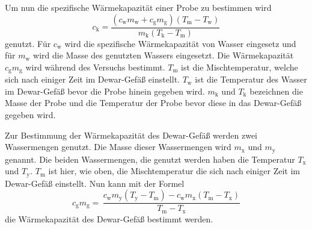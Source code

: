 Um nun die spezifische Wärmekapazität einer Probe zu bestimmen wird
\begin{equation}
   c_\text{k} = \frac{(c_\text{w}m_\text{w} + c_\text{g}m_\text{g})(T_\text{m}-T_\text{w})}{m_\text{k}(T_\text{k}-T_\text{m})} 
   \label{eqn:kapa}
\end{equation}
genutzt.
Für $c_\text{w}$ wird die spezifische Wärmekapazität von Wasser eingesetz und für $m_\text{w}$ wird die Masse des genutzten Wassers eingesetzt.
Die Wärmekapazität $c_\text{g}m_\text{g}$ wird während des Versuchs bestimmt.
$T_\text{m}$ ist die Mischtemperatur, welche sich nach einiger Zeit im Dewar-Gefäß einstellt.
$T_\text{w}$ ist die Temperatur des Wasser im Dewar-Gefäß bevor die Probe hinein gegeben wird.
$m_\text{k}$ und $T_\text{k}$ bezeichnen die Masse der Probe und die Temperatur der Probe bevor diese in das Dewar-Gefäß gegeben wird.

Zur Bestimmung der Wärmekapazität des Dewar-Gefäß werden zwei Wassermengen genutzt.
Die Masse dieser Wassermengen wird $m_\text{x}$ und $m_\text{y}$ genannt.
Die beiden Wassermengen, die genutzt werden haben die Temperatur $T_\text{x}$ und $T_\text{y}$.
$T_\text{m}$ ist hier, wie oben, die Mischtemperatur die sich nach einiger Zeit im Dewar-Gefäß einstellt.
Nun kann mit der Formel
\begin{equation}
    c_\text{g} m_\text{g} = \, \frac{c_\text{w}m_\text{y}(T_\text{y}-T_\text{m})-c_\text{w}m_\text{x}(T_\text{m}-T_\text{x})}{T_\text{m}-T_\text{x}}
    \label{eqn:dewar}
\end{equation}
die Wärmekapazität des Dewar-Gefäß bestimmt werden.